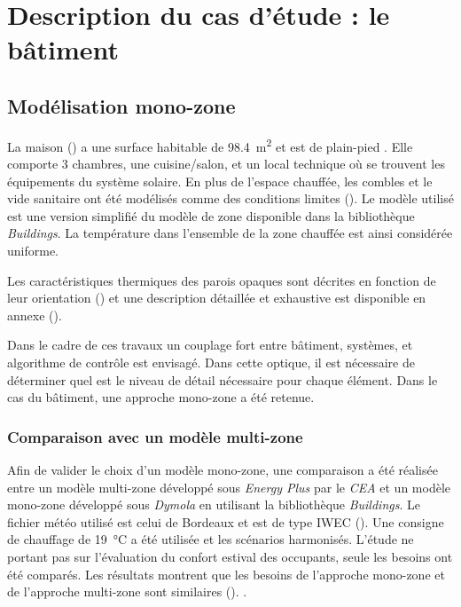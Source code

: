 \section{Description du cas d’étude : le bâtiment} %
\label{sec:description_du_cas_d_etude_le_batiment}
\subsection{Modélisation mono-zone} %
\label{sub:modelisation_monozone}
La maison () a une surface habitable de \SI{98.4}{\meter\squared}
et est de plain-pied .
Elle comporte 3 chambres, une cuisine/salon, et un local technique où se
trouvent les équipements du système solaire.
En plus de l’espace chauffée, les combles et le vide sanitaire ont été modélisés
comme des conditions limites (). Le modèle utilisé est une version
simplifié du modèle de zone disponible dans la bibliothèque \textit{Buildings}.
La température dans l’ensemble de la zone chauffée est ainsi considérée uniforme.

Les caractéristiques thermiques des parois opaques sont décrites en fonction de
leur orientation () et une description détaillée et exhaustive est
disponible en annexe ().

Dans le cadre de ces travaux un couplage fort entre bâtiment, systèmes, et algorithme
de contrôle est envisagé. Dans cette optique, il est nécessaire de déterminer quel
est le niveau de détail nécessaire pour chaque élément. Dans le cas du bâtiment, une
approche mono-zone a été retenue.


\subsubsection{Comparaison avec un modèle multi-zone} %
\label{ssub:comparaison_avec_un_modele_multi_zone}

Afin de valider le choix d’un modèle mono-zone, une comparaison a été réalisée
entre un modèle multi-zone développé sous \textit{Energy Plus} par le
\textit{CEA} et un modèle mono-zone développé sous \textit{Dymola} en utilisant
la bibliothèque \textit{Buildings}. Le fichier météo utilisé est celui de
Bordeaux et est de type IWEC (). Une
consigne de chauffage de \SI{19}{\celsius} a été utilisée et les scénarios
harmonisés. L’étude ne portant pas sur l’évaluation du confort estival des
occupants, seule les besoins ont été comparés. Les résultats montrent que les
besoins de l’approche mono-zone et de l’approche multi-zone sont similaires
().
.


